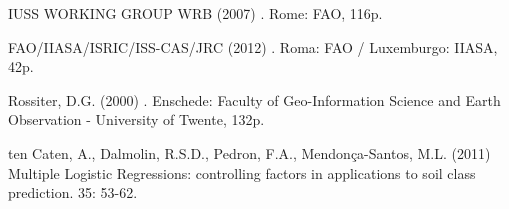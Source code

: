 \begin{footnotesize}
\begin{thebibliography}{99}




IUSS WORKING GROUP WRB (2007)
.
\newblock Rome: FAO, 116p.




FAO/IIASA/ISRIC/ISS-CAS/JRC (2012)
.
\newblock Roma: FAO / Luxemburgo: IIASA, 42p.




Rossiter, D.G. (2000)
.
\newblock Enschede: Faculty of Geo-Information Science and Earth Observation - University of Twente, 132p.




ten Caten, A., Dalmolin, R.S.D., Pedron, F.A., Mendonça-Santos, M.L. (2011)
\newblock Multiple Logistic Regressions: controlling factors in applications to soil class prediction.
 35: 53-62.




\end{thebibliography}
\end{footnotesize}




\address{Alessandro Samuel-Rosa\\
\footnotesize
UFRRJ e ISRIC-World Soil Information\\
\url{www.soil-scientist.net}\\
}





